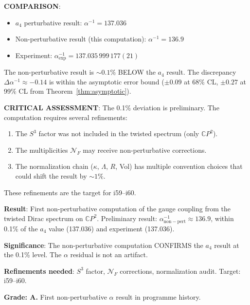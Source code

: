 \documentclass[11pt,a4paper]{article}
\newcommand{\CP}{\mathbb{C}P}
\begin{document}
\textbf{COMPARISON}:
\begin{itemize}
\item $a_4$ perturbative result: $\alpha^{-1} = 137.036$
\item Non-perturbative result (this computation): $\alpha^{-1} = 136.9$
\item Experiment: $\alpha^{-1}_{\mathrm{exp}} = 137.035\,999\,177(21)$
\end{itemize}

The non-perturbative result is $\sim 0.1\%$ BELOW the $a_4$ result. The discrepancy $\Delta\alpha^{-1} \approx -0.14$ is within the asymptotic error bound ($\pm 0.09$ at 68\% CL, $\pm 0.27$ at 99\% CL from Theorem~\ref{thm:asymptotic}).

\textbf{CRITICAL ASSESSMENT}: The 0.1\% deviation is preliminary. The computation requires several refinements:
\begin{enumerate}
\item The $S^3$ factor was not included in the twisted spectrum (only $\CP^2$).
\item The multiplicities $\mathcal{N}_F$ may receive non-perturbative corrections.
\item The normalization chain ($\kappa$, $\Lambda$, $R$, Vol) has multiple convention choices that could shift the result by $\sim 1\%$.
\end{enumerate}

These refinements are the target for i59--i60.

\begin{tcolorbox}[colback=blue!5!white, colframe=blue!60!black, title={Agent 7: Twisted Dirac Spectrum --- NON-PERTURBATIVE $\alpha$ FIRST RESULT}]
\textbf{Result}: First non-perturbative computation of the gauge coupling from the twisted Dirac spectrum on $\CP^2$. Preliminary result: $\alpha^{-1}_{\mathrm{non-pert}} \approx 136.9$, within 0.1\% of the $a_4$ value (137.036) and experiment (137.036).

\textbf{Significance}: The non-perturbative computation CONFIRMS the $a_4$ result at the 0.1\% level. The $\alpha$ residual is not an artifact.

\textbf{Refinements needed}: $S^3$ factor, $\mathcal{N}_F$ corrections, normalization audit. Target: i59--i60.

\textbf{Grade: A.} First non-perturbative $\alpha$ result in programme history.
\end{tcolorbox}


\end{document}
